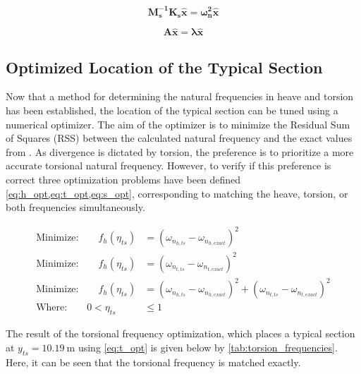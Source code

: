 \begin{equation}
    \label{eq:freq_eig}
    \bm{M_s^{-1} K_s \hat{x}} = \bm{\omega_n^2\hat{x}}
\end{equation}

\begin{equation}
    \label{eq:eig}
    \bm{A\hat{x}} = \bm{\lambda \hat{x}}
\end{equation}

\subsection{Optimized Location of the Typical Section}
Now that a method for determining the natural frequencies in heave and torsion
has been established, the location of the typical section can be tuned using a
numerical optimizer. The aim of the optimizer is to minimize the Residual Sum
of Squares (RSS) between the calculated natural frequency and the exact values
from \autocite{howcroftEfficientAeroelasticBeam2019}. As divergence is dictated
by torsion, the preference is to prioritize a more accurate torsional natural
frequency. However, to verify if this preference is correct three optimization
problems have been defined \cref{eq:h_opt,eq:t_opt,eq:s_opt}, corresponding to
matching the heave, torsion, or both frequencies simultaneously.

\begin{align}
    \text{Minimize:} \hspace{2em}
        f_{h}\left(\eta_{ts}\right) &=
        \left(\omega_{n_{h,ts}} - \omega_{n_{h,exact}}\right)^2
        \label{eq:h_opt}\\[1em]
    \text{Minimize:} \hspace{2em}
        f_{h}\left(\eta_{ts}\right) &=
        \left(\omega_{n_{t,ts}} - \omega_{n_{t,exact}}\right)^2
        \label{eq:t_opt}\\[1em]
    \text{Minimize:} \hspace{2em}
        f_{h}\left(\eta_{ts}\right) &=
        \left(\omega_{n_{h,ts}} - \omega_{n_{h,exact}}\right)^2 +
        \left(\omega_{n_{t,ts}} - \omega_{n_{t,exact}}\right)^2
        \label{eq:s_opt}\\[1em]
    \text{Where:} \hspace{2em} 0 < \eta_{ts} &\leq 1
\end{align}

The result of the torsional frequency optimization, which places a typical
section at $\boxed{y_{ts} = \SI{10.19}{\meter}}$ using \cref{eq:t_opt} is given
below by \cref{tab:torsion_frequencies}. Here, it can be seen that the
torsional frequency is matched exactly.

